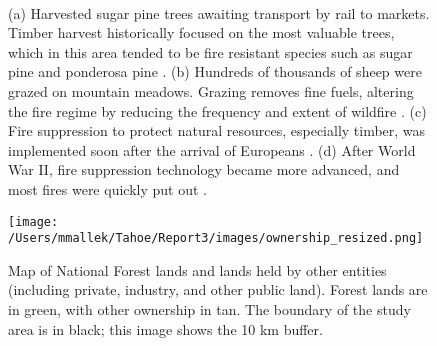\begin{figure}[!htbp]
  \centering
   \\
   \caption{(a) Harvested  sugar pine trees awaiting transport by rail to markets. Timber harvest historically focused on the most valuable trees, which in this area tended to be fire resistant species such as sugar pine and ponderosa pine \citep{YoseLibrary}. (b) Hundreds of thousands of sheep were grazed on mountain meadows. Grazing removes fine fuels, altering the fire regime by reducing the frequency and extent of wildfire \citep{Graff}. (c) Fire suppression to protect natural resources, especially timber, was implemented soon after the arrival of Europeans \citep{Barret1927}. (d) After World War II, fire suppression technology became more advanced, and most fires were quickly put out \citep{USFSRegion2013}.} 
\label{figs:historicalphotos}
\end{figure}



\begin{figure}[!htbp]
\centering
\texttt{[image: /Users/mmallek/Tahoe/Report3/images/ownership\_resized.png]}
\caption{Map of National Forest lands and lands held by other entities (including private, industry, and other public land). Forest lands are in green, with other ownership in tan. The boundary of the study area is in black; this image shows the 10 km buffer.} 
\label{ownership}
\end{figure}

